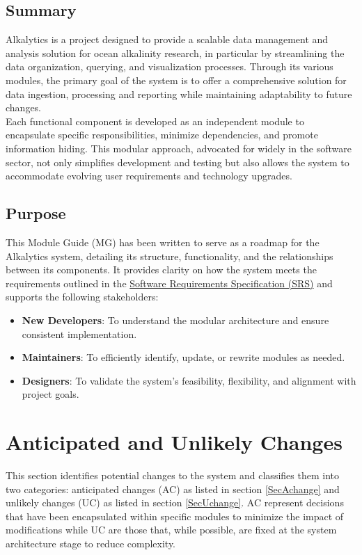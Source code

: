 \documentclass[12pt, titlepage]{article}
\begin{document}
\subsection{Summary}
Alkalytics is a project designed to provide a scalable data management and analysis
solution for ocean alkalinity research, in particular by streamlining the data 
organization, querying, and visualization processes. Through its various modules, 
the primary goal of the system is to offer a comprehensive solution for data 
ingestion, processing and reporting  while maintaining adaptability to future 
changes.\\
\newline
Each functional component is developed as an independent module to encapsulate 
specific responsibilities, minimize dependencies, and promote information
hiding. This modular approach, advocated for widely in the software sector, not only
simplifies development and testing but also allows the system to accommodate evolving
user requirements and technology upgrades.

\subsection{Purpose}
This Module Guide (MG) has been written to serve as a roadmap for the Alkalytics system,
detailing its structure, functionality, and the relationships between its components.
It provides clarity on how the system meets the requirements outlined in the 
\href{https://github.com/SumanyaG/Alkalytics/blob/main/docs/SRS/SRS.pdf}{Software Requirements Specification (SRS)}
and supports the following stakeholders:
\begin{itemize}
  \item \textbf{New Developers}: To understand the modular architecture and ensure
  consistent implementation.
  \item \textbf{Maintainers}: To efficiently identify, update, or rewrite modules as needed.
  \item \textbf{Designers}: To validate the system's feasibility, flexibility, and alignment
  with project goals. 
\end{itemize}

\section{Anticipated and Unlikely Changes} \label{SecChange}

This section identifies potential changes to the system and classifies them into
two categories: anticipated changes (AC) as listed in section \ref{SecAchange} and
unlikely changes (UC) as listed in section \ref{SecUchange}. AC represent decisions 
that have been encapsulated within specific modules to minimize the impact of 
modifications while UC are those that, while possible, are fixed at the system 
architecture stage to reduce complexity.
\end{document}
